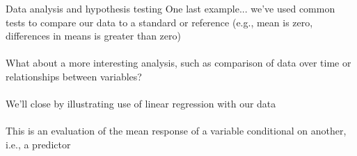 \documentclass[xcolor=svgnames]{beamer}
\begin{document}
\begin{frame}{Data analysis and hypothesis testing}
One last example... we've used common tests to compare our data to a standard or reference (e.g., mean is zero, differences in means is greater than zero)\\~\\
What about a more interesting analysis, such as comparison of data over time or relationships between variables?\\~\\
We'll close by illustrating use of linear regression with our data\\~\\
This is an evaluation of the mean response of a variable conditional on another, i.e., a predictor
\end{frame}
\end{document}
